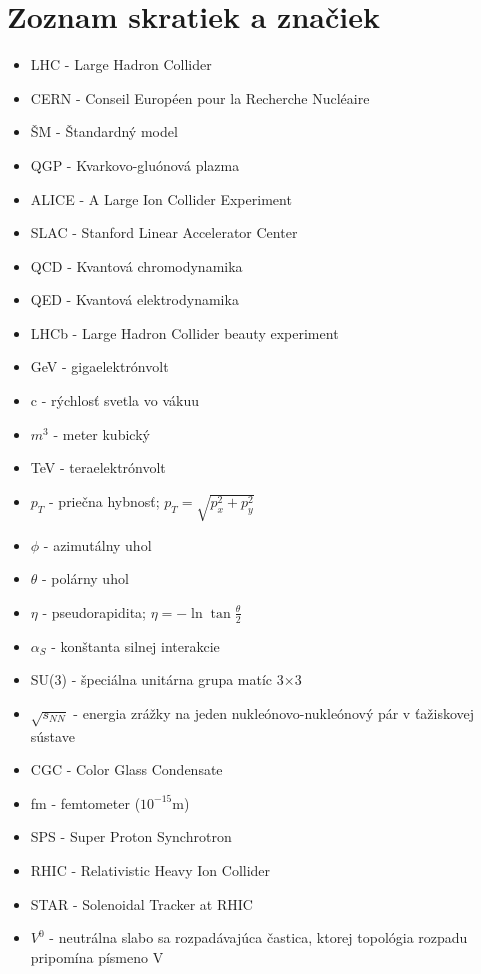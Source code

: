 \documentclass[thesismargins, thesislinespacing]{rnthesis}
\begin{document}
\chapter*{Zoznam skratiek a značiek}
\begin{itemize}
	\item[] LHC - Large Hadron Collider
	\item[] CERN - Conseil Européen pour la Recherche Nucléaire
	\item[] ŠM - Štandardný model
	\item[] QGP - Kvarkovo-gluónová plazma
	\item[] ALICE - A Large Ion Collider Experiment
	\item[] SLAC - Stanford Linear Accelerator Center
	\item[] QCD - Kvantová chromodynamika
	\item[] QED - Kvantová elektrodynamika
	\item[] LHCb - Large Hadron Collider beauty experiment
	\item[] GeV - gigaelektrónvolt
	\item[] c - rýchlosť svetla vo vákuu
	\item[] $m^3$ - meter kubický
	\item[] TeV - teraelektrónvolt
	\item[] $p_T$ - priečna hybnosť; $p_T=\sqrt{p_{x}^2+p_{y}^2}$
	\item[] $\phi$ - azimutálny uhol
	\item[] $\theta$ - polárny uhol
	\item[] $\eta$ - pseudorapidita; $\eta=-\ln \tan {\frac{\theta}{2}}$
	\item[] $\alpha_S$ - konštanta silnej interakcie
	\item[] SU(3) - špeciálna unitárna grupa matíc 3$\times$3
	\item[] $\sqrt{s_{NN}}$ - energia zrážky na jeden nukleónovo-nukleónový pár v ťažiskovej sústave 
	\item[] CGC - Color Glass Condensate
	\item[] fm - femtometer ($10^{-15}$m)
	\item[] SPS - Super Proton Synchrotron 
	\item[] RHIC - Relativistic Heavy Ion Collider
	\item[] STAR - Solenoidal Tracker at RHIC
	\item[] $V^{0}$ - neutrálna slabo sa rozpadávajúca častica, ktorej topológia rozpadu pripomína písmeno V

\end{itemize}
\end{document}
